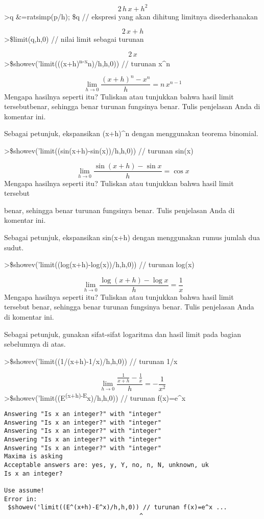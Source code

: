 \documentclass[
]{book}
\begin{document}
\[2\,h\,x+h^2\]\textgreater q \&=ratsimp(p/h); \$q // ekspresi yang akan dihitung limitnya disederhanakan

\[2\,x+h\]\textgreater\$limit(q,h,0) // nilai limit sebagai turunan

\[2\,x\]\textgreater\$showev('limit(((x+h)\textsuperscript{n-x}n)/h,h,0)) // turunan x\^{}n

\[\lim_{h\rightarrow 0}{\frac{\left(x+h\right)^{n}-x^{n}}{h}}=n\,x^{n  -1}\]Mengapa hasilnya seperti itu? Tuliskan atau tunjukkan bahwa hasil limit tersebutbenar, sehingga benar turunan fungsinya benar. Tulis penjelasan Anda di komentar ini.

Sebagai petunjuk, ekspansikan (x+h)\^{}n dengan menggunakan teorema binomial.

\textgreater\$showev('limit((sin(x+h)-sin(x))/h,h,0)) // turunan sin(x)

\[\lim_{h\rightarrow 0}{\frac{\sin \left(x+h\right)-\sin x}{h}}=\cos   x\]Mengapa hasilnya seperti itu? Tuliskan atau tunjukkan bahwa hasil limit tersebut

benar, sehingga benar turunan fungsinya benar. Tulis penjelasan Anda di komentar ini.

Sebagai petunjuk, ekspansikan sin(x+h) dengan menggunakan rumus jumlah dua sudut.

\textgreater\$showev('limit((log(x+h)-log(x))/h,h,0)) // turunan log(x)

\[\lim_{h\rightarrow 0}{\frac{\log \left(x+h\right)-\log x}{h}}=  \frac{1}{x}\]Mengapa hasilnya seperti itu? Tuliskan atau tunjukkan bahwa hasil limit tersebut benar, sehingga benar turunan fungsinya benar. Tulis penjelasan Anda di komentar ini.

Sebagai petunjuk, gunakan sifat-sifat logaritma dan hasil limit pada bagian sebelumnya di atas.

\textgreater\$showev('limit((1/(x+h)-1/x)/h,h,0)) // turunan 1/x

\[\lim_{h\rightarrow 0}{\frac{\frac{1}{x+h}-\frac{1}{x}}{h}}=-\frac{1  }{x^2}\]\textgreater\$showev('limit((E\textsuperscript{(x+h)-E}x)/h,h,0)) // turunan f(x)=e\^{}x

\begin{verbatim}
Answering "Is x an integer?" with "integer"
Answering "Is x an integer?" with "integer"
Answering "Is x an integer?" with "integer"
Answering "Is x an integer?" with "integer"
Answering "Is x an integer?" with "integer"
Maxima is asking
Acceptable answers are: yes, y, Y, no, n, N, unknown, uk
Is x an integer?

Use assume!
Error in:
 $showev('limit((E^(x+h)-E^x)/h,h,0)) // turunan f(x)=e^x ...
                                     ^
\end{verbatim}
\end{document}
